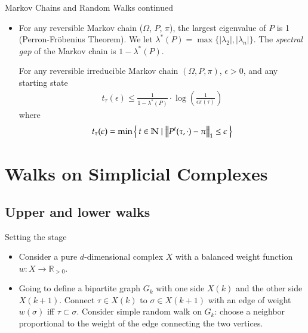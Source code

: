 \documentclass[10pt]{beamer}
\newcommand\norm[1]{\left\lVert#1\right\rVert}
\newcommand{\R}{\mathbb{R}}
\newcommand{\N}{\mathbb{N}}
\begin{document}
\begin{frame}{Markov Chains and Random Walks continued}
\begin{itemize}
    \item For any reversible Markov chain ($\Omega$, $P$, $\pi$), the largest eigenvalue of $P$ is 1 (Perron-Fröbenius Theorem). We let $\lambda^*(P) = \max\{|\lambda_2|, |\lambda_n|\}$. The \textit{spectral gap} of the Markov chain is $1-\lambda^*(P)$.
    \begin{theorem}[2.9, (DS)]
    For any reversible irreducible Markov chain $(\Omega, P, \pi)$, $\epsilon > 0$, and any starting state
    \begin{align*}
        t_\tau(\epsilon) \leq \frac{1}{1-\lambda^*(P)}\cdot \log \left(\frac{1}{\epsilon \pi(\tau)}\right)
    \end{align*}
    where
    \begin{align*}
        t_\tau(\epsilon) = \min \Set{t \in \N \mid \norm{P^t(\tau, \cdot) - \pi}_1\leq \epsilon}
    \end{align*}
    \end{theorem}
\end{itemize}
\end{frame}

\section{Walks on Simplicial Complexes}
\subsection{Upper and lower walks}
\begin{frame}{Setting the stage}
\begin{itemize}
    \item Consider a pure $d$-dimensional complex $X$ with a balanced weight function $w : X \to \R_{>0}$.
    \item Going to define a bipartite graph $G_k$ with one side $X(k)$ and the other side $X(k+1)$. Connect $\tau \in X(k)$ to $\sigma \in X(k+1)$ with an edge of weight $w(\sigma)$ iff $\tau \subset \sigma$. Consider simple random walk on $G_k$: choose a neighbor proportional to the weight of the edge connecting the two vertices. 
\end{itemize}
\end{frame}
\end{document}
